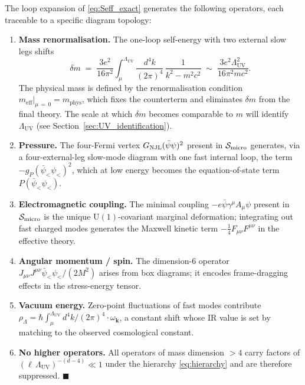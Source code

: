 \documentclass[11pt,a4paper]{article}
\theoremstyle{definition}
\theoremstyle{remark}
\begin{document}
		The loop expansion of \eqref{eq:Seff_exact} generates the following operators,
		each traceable to a specific diagram topology:
		\begin{enumerate}
			\item \textbf{Mass renormalisation.}
			The one-loop self-energy with two external slow legs shifts
			\begin{equation}
				\delta m \;=\; \frac{3e^2}{16\pi^2}\int_\mu^{\Lambda_{\mathrm{UV}}}
				\frac{d^4k}{(2\pi)^4}\,\frac{1}{k^2 - m^2c^2}
				\;\sim\; \frac{3e^2\Lambda_{\mathrm{UV}}^2}{16\pi^2 mc^2}.
				\label{eq:deltam}
			\end{equation}
			The physical mass is defined by the renormalisation condition
			$m_{\mathrm{eff}}|_{\mu\,=\,0} = m_{\mathrm{phys}}$, which fixes
			the counterterm and eliminates $\delta m$ from the final theory.
			The scale at which $\delta m$ becomes comparable to $m$ will identify
			$\Lambda_{\mathrm{UV}}$ (see Section~\ref{sec:UV_identification}).
			
			\item \textbf{Pressure.}
			The four-Fermi vertex $G_{\rm NJL}(\bar{\psi}\psi)^2$ present in $\mathcal{S}_{\rm micro}$ generates, via a four-external-leg slow-mode diagram with one fast internal loop, the term $-g_P(\bar{\psi}_{<}\psi_{<})^2$, which at low energy becomes the equation-of-state term $P(\bar{\psi}_{<}\psi_{<})$.
			
			\item \textbf{Electromagnetic coupling.}
			The minimal coupling $-e\bar{\psi}\gamma^\mu A_\mu\psi$ present in $\mathcal{S}_{\rm micro}$ is the unique $\mathrm{U}(1)$-covariant marginal deformation; integrating out fast charged modes generates the Maxwell kinetic term $-\tfrac{1}{4}F_{\mu\nu}F^{\mu\nu}$ in the effective theory.
			
			\item \textbf{Angular momentum / spin.}
			The dimension-6 operator
			$J_{\mu\nu}J^{\mu\nu}\bar{\psi}_{<}\psi_{<}/(2M^2)$ arises from
			box diagrams; it encodes frame-dragging effects in the stress-energy
			tensor.
			
			\item \textbf{Vacuum energy.}
			Zero-point fluctuations of fast modes contribute
			$\rho_\Lambda = \hbar\int_\mu^{\Lambda_{\mathrm{UV}}}
			d^4k/(2\pi)^4\cdot\omega_{\mathbf{k}}$, a constant shift whose
			IR value is set by matching to the observed cosmological constant.
			
			\item \textbf{No higher operators.}
			All operators of mass dimension $>4$ carry factors of
			$(\ell\,\Lambda_{\mathrm{UV}})^{-(d-4)} \ll 1$ under the hierarchy
			\eqref{eq:hierarchy} and are therefore suppressed. \hfill$\blacksquare$
		\end{enumerate}
	
\end{document}
